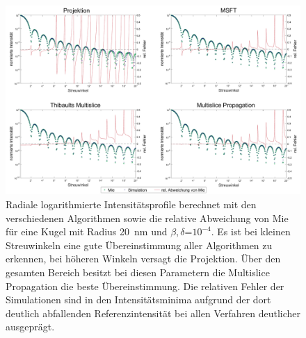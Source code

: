 \clearpage
\begin{figure} %
	\centering
	\includegraphics[width=1\textwidth]{images/fig_sim_profile.pdf}
	\captionsetup{width=0.95\textwidth}
	\caption[Radiale Profile]{Radiale logarithmierte Intensitätsprofile berechnet mit den verschiedenen Algorithmen sowie die relative Abweichung von Mie für eine Kugel mit Radius \SI{20}{nm} und $\beta,\delta$=$10^{-4}$. Es ist bei kleinen Streuwinkeln eine gute Übereinstimmung aller Algorithmen zu erkennen, bei höheren Winkeln versagt die Projektion. Über den gesamten Bereich besitzt bei diesen Parametern die Multislice Propagation die beste Übereinstimmung. Die relativen Fehler der Simulationen sind in den Intensitätsminima aufgrund der dort deutlich abfallenden Referenzintensität bei allen Verfahren deutlicher ausgeprägt.}
	\label{fig:profil}
\end{figure}
\clearpage


